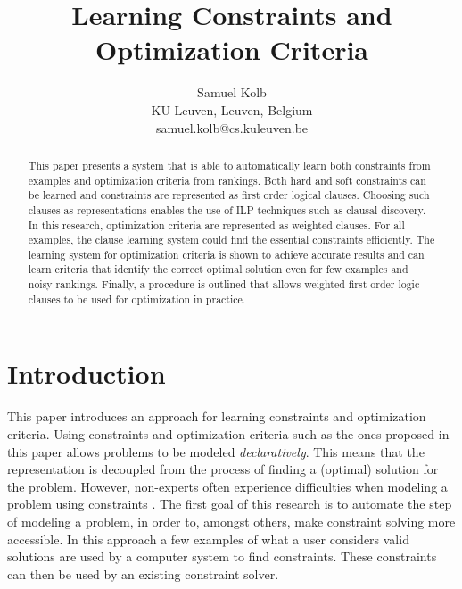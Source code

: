 \documentclass[letterpaper]{article}
\theoremstyle{definition}
\begin{document}
\title{Learning Constraints and Optimization Criteria}
\author{
  Samuel Kolb\\
  KU Leuven, Leuven, Belgium\\
  samuel.kolb@cs.kuleuven.be
}

\maketitle

\begin{abstract}
This paper presents a system that is able to automatically learn both constraints from examples and optimization criteria from rankings.
Both hard and soft constraints can be learned and constraints are represented as first order logical clauses.
Choosing such clauses as representations enables the use of ILP techniques such as clausal discovery.
In this research, optimization criteria are represented as weighted clauses.
For all examples, the clause learning system could find the essential constraints efficiently.
The learning system for optimization criteria is shown to achieve accurate results and can learn criteria that identify the correct optimal solution even for few examples and noisy rankings.
Finally, a procedure is outlined that allows weighted first order logic clauses to be used for optimization in practice.
\end{abstract}


\section{Introduction}
This paper introduces an approach for learning constraints and optimization criteria.
Using constraints and optimization criteria such as the ones proposed in this paper allows problems to be modeled \emph{declaratively}.
This means that the representation is decoupled from the process of finding a (optimal) solution for the problem.
However, non-experts often experience difficulties when modeling a problem using constraints \cite{Wallace:PrinciplesCP}.
The first goal of this research is to automate the step of modeling a problem, in order to, amongst others, make constraint solving more accessible.
In this approach a few examples of what a user considers valid solutions are used by a computer system to find constraints.
These constraints can then be used by an existing constraint solver.
\end{document}
